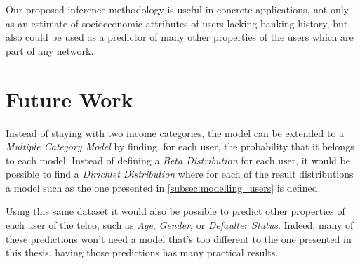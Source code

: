 Our proposed inference methodology is useful in concrete applications, not only as an estimate of socioeconomic attributes of users lacking banking history, but also could be used as a predictor of many other properties of the users which are part of any network.

\section{Future Work}

Instead of staying with two income categories, the model can be extended to a \emph{Multiple Category Model} by finding, for each user, the probability that it belongs to each model.
Instead of defining a \emph{Beta Distribution} for each user, it would be possible to find a \emph{Dirichlet Distribution} where for each of the result distributions a model such as the one presented in \cref{subsec:modelling_users} is defined.

Using this same dataset it would also be possible to predict other properties of each user of the telco, such as \emph{Age}, \emph{Gender}, or \emph{Defaulter Status}. Indeed, many of these predictions won't need a model that's too different to the one presented in this thesis, having those predictions has many practical results.
